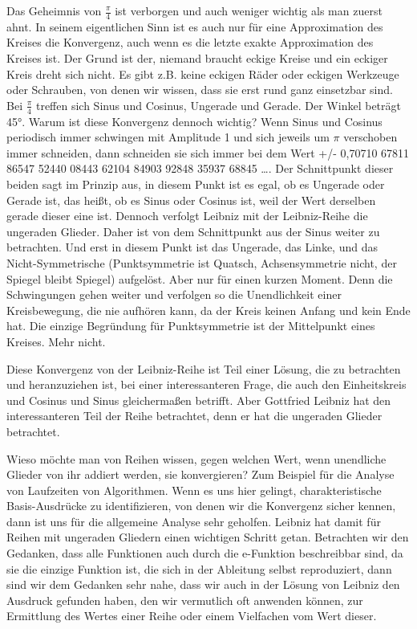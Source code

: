 \documentclass[a4paper,12pt,twoside]{report}
\theoremstyle{definition}
\begin{document}
Das Geheimnis von $\frac{\pi}{4}$ ist verborgen und auch weniger wichtig als man zuerst ahnt. In seinem eigentlichen Sinn ist es auch nur für eine Approximation des Kreises die Konvergenz, auch wenn es die letzte exakte Approximation des Kreises ist. Der Grund ist der, niemand braucht eckige Kreise und ein eckiger Kreis dreht sich nicht. Es gibt z.B. keine eckigen Räder oder eckigen Werkzeuge oder Schrauben, von denen wir wissen, dass sie erst rund ganz einsetzbar sind. Bei $\frac{\pi}{4}$ treffen sich Sinus und Cosinus, Ungerade und Gerade. Der Winkel beträgt 45°. Warum ist diese Konvergenz dennoch wichtig? Wenn Sinus und Cosinus periodisch immer schwingen mit Amplitude 1 und sich jeweils um $\pi$ verschoben immer schneiden, dann schneiden sie sich immer bei dem Wert +/- 0,70710 67811 86547 52440 08443 62104 84903 92848 35937 68845 \ldots . Der Schnittpunkt dieser beiden sagt im Prinzip aus, in diesem Punkt ist es egal, ob es Ungerade oder Gerade ist, das heißt, ob es Sinus oder Cosinus ist, weil der Wert derselben gerade dieser eine ist. Dennoch verfolgt Leibniz mit der Leibniz-Reihe die ungeraden Glieder. Daher ist von dem Schnittpunkt aus der Sinus weiter zu betrachten. Und erst in diesem Punkt ist das Ungerade, das Linke, und das Nicht-Symmetrische (Punktsymmetrie ist Quatsch, Achsensymmetrie nicht, der Spiegel bleibt Spiegel) aufgelöst. Aber nur für einen kurzen Moment. Denn die Schwingungen gehen weiter und verfolgen so die Unendlichkeit einer Kreisbewegung, die nie aufhören kann, da der Kreis keinen Anfang und kein Ende hat. Die einzige Begründung für Punktsymmetrie ist der Mittelpunkt eines Kreises. Mehr nicht.

Diese Konvergenz von der Leibniz-Reihe ist Teil einer Lösung, die zu betrachten und heranzuziehen ist, bei einer interessanteren Frage, die auch den Einheitskreis und Cosinus und Sinus gleichermaßen betrifft. Aber Gottfried Leibniz hat den interessanteren Teil der Reihe betrachtet, denn er hat die ungeraden Glieder betrachtet.

Wieso möchte man von Reihen wissen, gegen welchen Wert, wenn unendliche Glieder von ihr addiert werden, sie konvergieren? Zum Beispiel für die Analyse von Laufzeiten von Algorithmen. Wenn es uns hier gelingt, charakteristische Basis-Ausdrücke zu identifizieren, von denen wir die Konvergenz sicher kennen, dann ist uns für die allgemeine Analyse sehr geholfen. Leibniz hat damit für Reihen mit ungeraden Gliedern einen wichtigen Schritt getan. Betrachten wir den Gedanken, dass alle Funktionen auch durch die e-Funktion beschreibbar sind, da sie die einzige Funktion ist, die sich in der Ableitung selbst reproduziert, dann sind wir dem Gedanken sehr nahe, dass wir auch in der Lösung von Leibniz den Ausdruck gefunden haben, den wir vermutlich oft anwenden können, zur Ermittlung des Wertes einer Reihe oder einem Vielfachen vom Wert dieser.
\end{document}
